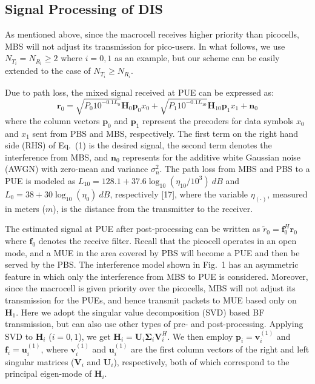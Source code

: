 \documentclass[10pt, conference, letterpaper]{IEEEtran}
\begin{document}
\subsection{Signal Processing of DIS}

As mentioned above, since the macrocell receives higher priority than picocells,
MBS will not adjust its transmission for pico-users.
In what follows,
we use $N_{T_{i}}=N_{R_{i}}\geq 2$ where $i=0,1$ as an example,
but our scheme can be easily extended to the case of $N_{T_{i}}\geq N_{R_{i}}$.

Due to path loss, the mixed signal received at PUE can be expressed as:
\begin{equation}
\mathbf{r}_{0}=\sqrt{P_{0}10^{-0.1L_{0}}}\mathbf{H}_{0}\mathbf{p}_{0}{x}_{0}
+\sqrt{P_{1}10^{-0.1L_{10}}}\mathbf{H}_{10}\mathbf{p}_{1}x_{1}
+\mathbf{n}_{0}
\end{equation}
where the column vectors $\mathbf{p}_{0}$ and $\mathbf{p}_{1}$
represent the precoders for data symbols $x_{0}$ and $x_{1}$
sent from PBS and MBS, respectively.
The first term on the right hand side (RHS) of Eq.~(1) is the desired signal,
the second term denotes the interference from MBS, and $\mathbf{n}_{0}$
represents for the additive white Gaussian noise (AWGN) with zero-mean and variance $\sigma^{2}_{n}$.
The path loss from MBS and PBS to a PUE %
is modeled as
$L_{10}=128.1+37.6\log_{10}(\eta_{10}/10^{3})~dB$ and
$L_{0}=38+30\log_{10}(\eta_{0})~dB$,
respectively [17],
where the variable $\eta_{(\cdot)}$, measured in meters ($m$), is the distance from the transmitter to the receiver.

The estimated signal at PUE after post-processing can be written as
$\tilde{r}_{0}=\mathbf{f}^{H}_{0}\mathbf{r}_{0}$ where $\mathbf{f}_{0}$ denotes the receive filter.
Recall that the picocell operates in an open mode, and a MUE in the area covered
by PBS will become a PUE and then be served by the PBS.
The interference model shown in Fig.~1 has an asymmetric feature
in which only the interference from MBS to PUE is considered.
Moreover, since the macrocell is given priority over the picocells,
MBS will not adjust its transmission for the PUEs, and hence
transmit packets to MUE based only on $\mathbf{H}_{1}$.
Here we adopt the singular value decomposition (SVD) based BF transmission,
but can also use other types of pre- and post-processing.
Applying SVD to $\mathbf{H}_{i}$ ($i=0,1$), we get
$\mathbf{H}_{i}=\mathbf{U}_{i}\mathbf{\Sigma}_{i}\mathbf{V}^{H}_{i}$.
We then employ $\mathbf{p}_{i}=\mathbf{v}^{(1)}_{i}$ and $\mathbf{f}_{i}=\mathbf{u}^{(1)}_{i}$,
where $\mathbf{v}^{(1)}_{i}$ and $\mathbf{u}^{(1)}_{i}$ are the first column vectors
of the right and left singular matrices ($\mathbf{V}_{i}$ and $\mathbf{U}_{i}$), respectively,
both of which correspond to the principal eigen-mode of $\mathbf{H}_{i}$.
\end{document}
